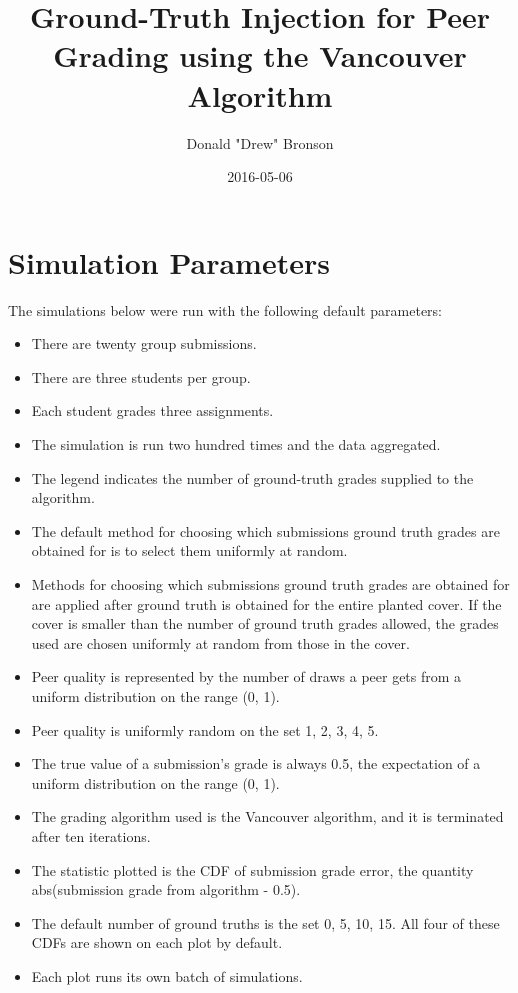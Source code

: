 \documentclass{article}
\title{Ground-Truth Injection for Peer Grading using the Vancouver Algorithm}
\author{Donald "Drew" Bronson}
\date{2016-05-06}
\begin{document}
	\maketitle
	

	\section{Simulation Parameters}
	The simulations below were run with the following default parameters:
	\begin{itemize}
		\item There are twenty group submissions.
		\item There are three students per group.
		\item Each student grades three assignments.
		\item The simulation is run two hundred times and the data aggregated.
		\item The legend indicates the number of ground-truth grades supplied to the algorithm.
		\item The default method for choosing which submissions ground truth grades are obtained for is to select them uniformly at random.
		\item Methods for choosing which submissions ground truth grades are obtained for are applied after ground truth is obtained for the entire planted cover. If the cover is smaller than the number of ground truth grades allowed, the grades used are chosen uniformly at random from those in the cover.
		\item Peer quality is represented by the number of draws a peer gets from a uniform distribution on the range (0, 1).
		\item Peer quality is uniformly random on the set {1, 2, 3, 4, 5}.
		\item The true value of a submission's grade is always 0.5, the expectation of a uniform distribution on the range (0, 1).
		\item The grading algorithm used is the Vancouver algorithm, and it is terminated after ten iterations.
		\item The statistic plotted is the CDF of submission grade error, the quantity abs(submission grade from algorithm - 0.5).
		\item The default number of ground truths is the set {0, 5, 10, 15}. All four of these CDFs are shown on each plot by default.
		\item Each plot runs its own batch of simulations.
	\end{itemize}
	
\end{document}

